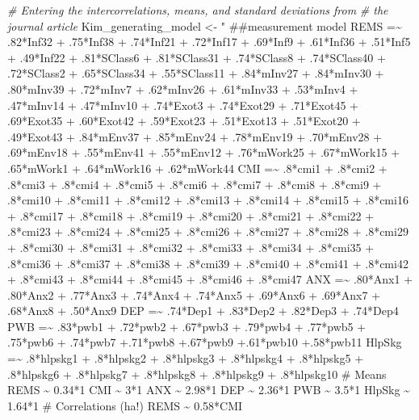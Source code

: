 \documentclass[
  11pt,
]{book}
\newenvironment{Shaded}{\begin{snugshade}}{\end{snugshade}}
\newcommand{\CommentTok}[1]{\textcolor[rgb]{0.37,0.37,0.37}{\textit{#1}}}
\newcommand{\NormalTok}[1]{#1}
\newcommand{\OtherTok}[1]{\textcolor[rgb]{0.37,0.37,0.37}{#1}}
\newcommand{\StringTok}[1]{\textcolor[rgb]{0.5,0.5,0.5}{#1}}
\begin{document}
\begin{Shaded}
\begin{Highlighting}[]
\CommentTok{\# Entering the intercorrelations, means, and standard deviations from}
\CommentTok{\# the journal article}
\NormalTok{Kim\_generating\_model }\OtherTok{\textless{}{-}} \StringTok{"}
\StringTok{        \#\#measurement model}
\StringTok{         REMS =\textasciitilde{} .82*Inf32 + .75*Inf38 + .74*Inf21 + .72*Inf17 + .69*Inf9 + .61*Inf36 + .51*Inf5 + .49*Inf22 + .81*SClass6 + .81*SClass31 + .74*SClass8 + .74*SClass40 + .72*SClass2 + .65*SClass34 + .55*SClass11 + .84*mInv27 + .84*mInv30 + .80*mInv39 + .72*mInv7 + .62*mInv26 + .61*mInv33 + .53*mInv4 + .47*mInv14 + .47*mInv10 + .74*Exot3 + .74*Exot29 + .71*Exot45 + .69*Exot35 + .60*Exot42 + .59*Exot23 + .51*Exot13 + .51*Exot20 + .49*Exot43 + .84*mEnv37 + .85*mEnv24 + .78*mEnv19 + .70*mEnv28 + .69*mEnv18 + .55*mEnv41 + .55*mEnv12 + .76*mWork25 + .67*mWork15 + .65*mWork1 + .64*mWork16 + .62*mWork44}
\StringTok{         }
\StringTok{         CMI =\textasciitilde{} .8*cmi1 + .8*cmi2 + .8*cmi3 + .8*cmi4 + .8*cmi5 + .8*cmi6 + .8*cmi7 + .8*cmi8 + .8*cmi9 + .8*cmi10 + .8*cmi11 + .8*cmi12 + .8*cmi13 + .8*cmi14 + .8*cmi15 + .8*cmi16 + .8*cmi17 + .8*cmi18 + .8*cmi19 + .8*cmi20 + .8*cmi21 + .8*cmi22 + .8*cmi23 + .8*cmi24 + .8*cmi25 + .8*cmi26 + .8*cmi27 + .8*cmi28 + .8*cmi29 + .8*cmi30 + .8*cmi31 + .8*cmi32 + .8*cmi33 + .8*cmi34 + .8*cmi35 + .8*cmi36 + .8*cmi37 + .8*cmi38 + .8*cmi39 + .8*cmi40 + .8*cmi41 + .8*cmi42 + .8*cmi43 + .8*cmi44 + .8*cmi45 + .8*cmi46 + .8*cmi47}
\StringTok{         }
\StringTok{         ANX =\textasciitilde{} .80*Anx1 + .80*Anx2 + .77*Anx3 + .74*Anx4 + .74*Anx5 + .69*Anx6 + .69*Anx7 + .68*Anx8 + .50*Anx9  }
\StringTok{         DEP =\textasciitilde{} .74*Dep1 + .83*Dep2 + .82*Dep3 + .74*Dep4}
\StringTok{         PWB =\textasciitilde{} .83*pwb1 + .72*pwb2 + .67*pwb3 + .79*pwb4 + .77*pwb5 + .75*pwb6 + .74*pwb7 +.71*pwb8 +.67*pwb9 +.61*pwb10 +.58*pwb11}
\StringTok{         }
\StringTok{         HlpSkg =\textasciitilde{} .8*hlpskg1 + .8*hlpskg2 + .8*hlpskg3 + .8*hlpskg4 + .8*hlpskg5 + .8*hlpskg6 + .8*hlpskg7 + .8*hlpskg8 + .8*hlpskg9 + .8*hlpskg10 }
\StringTok{   }
\StringTok{        \# Means}
\StringTok{         REMS \textasciitilde{} 0.34*1}
\StringTok{         CMI \textasciitilde{} 3*1}
\StringTok{         ANX \textasciitilde{} 2.98*1}
\StringTok{         DEP \textasciitilde{} 2.36*1}
\StringTok{         PWB \textasciitilde{} 3.5*1}
\StringTok{         HlpSkg \textasciitilde{} 1.64*1}
\StringTok{        \# Correlations (ha!)}
\StringTok{         REMS \textasciitilde{} 0.58*CMI}

\end{Highlighting}
\end{Shaded}
\end{document}
